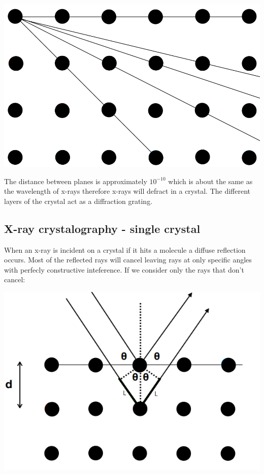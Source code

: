 \documentclass{article}
\begin{document}
\begin{center}
\includegraphics[scale=0.2]{CrystalPlanes}
\end{center}

The distance between planes is approximately \(10^{-10}\) which is about the same as the wavelength of x-rays therefore x-rays will defract in a crystal. The different layers of the crystal act as a diffraction grating.

\subsection*{X-ray crystalography - single crystal}

When an x-ray is incident on a crystal if it hits a molecule a diffuse reflection occurs. Most of the reflected rays will cancel leaving rays at only specific angles with perfecly constructive inteference. If we consider only the rays that don't cancel:

\begin{center}
\includegraphics[scale=0.4]{CrystalReflection}
\end{center}
\end{document}
